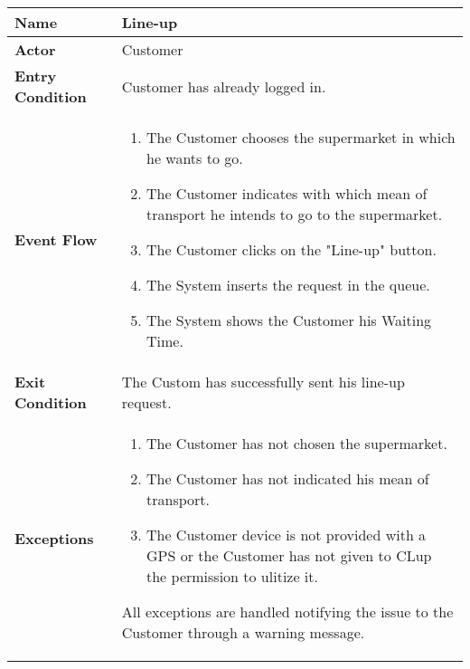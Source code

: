 \begin{center}
    \begin{tabular}{ | l | p{11cm} |}
    \hline
    \textbf{Name} & Line-up \\ \hline
    \textbf{Actor} & Customer \\ \hline
    \textbf{Entry Condition} & Customer has already logged in.  \\ \hline
    \textbf{Event Flow} & \begin{enumerate}
					\item The Customer chooses the supermarket in which he wants to go.
					\item The Customer indicates with which mean of transport he intends to go to the supermarket.
					\item The Customer clicks on the "Line-up" button.
					\item The System inserts the request in the queue.
					\item The System shows the Customer his Waiting Time.
		            \end{enumerate}\\  \hline
    \textbf{Exit Condition} & The Custom has successfully sent his line-up request. \\ \hline
    \textbf{Exceptions} & \begin{enumerate}
					\item The Customer has not chosen the supermarket.
					\item The Customer has not indicated his mean of transport. 
					\item The Customer device is not provided with a GPS or the Customer has not  given to CLup the permission to ulitize it.
		            \end{enumerate} All exceptions are handled notifying the issue to the Customer through a warning message.\\  \hline
				
    \end{tabular}
\end{center}

